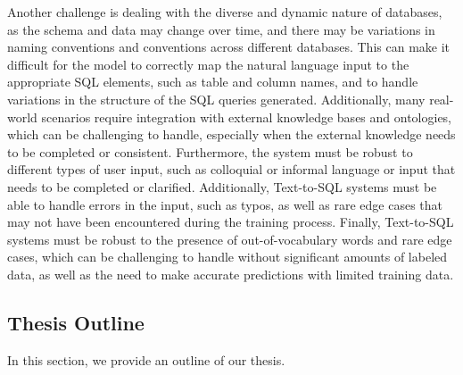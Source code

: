 Another challenge is dealing with the diverse and dynamic nature of databases, as the schema and data may change over time, and there may be variations in naming conventions and conventions across different databases. This can make it difficult for the model to correctly map the natural language input to the appropriate SQL elements, such as table and column names, and to handle variations in the structure of the SQL queries generated. Additionally, many real-world scenarios require integration with external knowledge bases and ontologies, which can be challenging to handle, especially when the external knowledge needs to be completed or consistent. Furthermore, the system must be robust to different types of user input, such as colloquial or informal language or input that needs to be completed or clarified. Additionally, Text-to-SQL systems must be able to handle errors in the input, such as typos, as well as rare edge cases that may not have been encountered during the training process. Finally, Text-to-SQL systems must be robust to the presence of out-of-vocabulary words and rare edge cases, which can be challenging to handle without significant amounts of labeled data, as well as the need to make accurate predictions with limited training data.

\clearpage
\subsection{Thesis Outline}


In this section, we provide an outline of our thesis.

